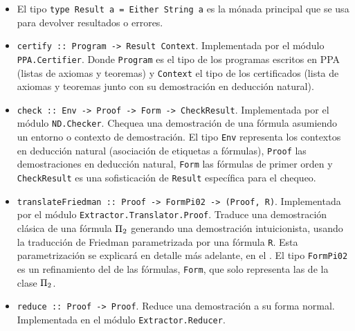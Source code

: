 \begin{itemize}
    \item El tipo \texttt{type Result a = Either String a} es la mónada principal que se usa para devolver resultados o errores.
    \item \texttt{certify :: Program -> Result Context}. Implementada por el módulo \texttt{PPA.Certifier}. Donde \texttt{Program} es el tipo de los programas escritos en PPA (listas de axiomas y teoremas) y \texttt{Context} el tipo de los certificados (lista de axiomas y teoremas junto con su demostración en deducción natural).
    \item \texttt{check :: Env -> Proof -> Form -> CheckResult}.
    Implementada por el módulo \texttt{ND.Checker}. Chequea una demostración de una fórmula asumiendo un entorno o contexto de demostración. El tipo \texttt{Env} representa los contextos en deducción natural (asociación de etiquetas a fórmulas), \texttt{Proof} las demostraciones en deducción natural, \texttt{Form} las fórmulas de primer orden y \texttt{CheckResult} es una sofisticación de \texttt{Result} específica para el chequeo.
    \item \texttt{translateFriedman :: Proof -> FormPi02 -> (Proof, R)}. Implementada por el módulo \texttt{Extractor.Translator.Proof}. Traduce una demostración clásica de una fórmula $\Pi_{2}$ generando una demostración intuicionista, usando la traducción de Friedman parametrizada por una fórmula \texttt{R}. Esta parametrización se explicará en detalle más adelante, en el . El tipo \texttt{FormPi02} es un refinamiento del de las fórmulas, \texttt{Form}, que solo representa las de la clase $\Pi_{2}$.
    \item \texttt{reduce :: Proof -> Proof}. Reduce una demostración a su forma normal. Implementada en el módulo \texttt{Extractor.Reducer}.
\end{itemize}


